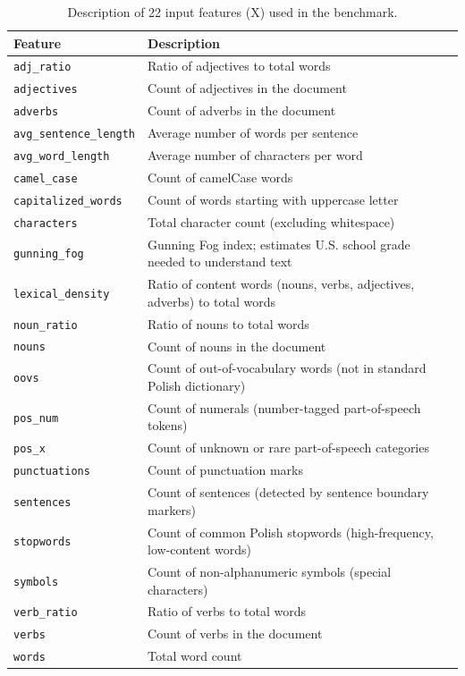 \documentclass[11pt]{article}
\begin{document}
\begin{table}[htbp]
\centering
\caption{Description of 22 input features (X) used in the benchmark.}
\label{tab:feature_descriptions}
\small
\begin{tabular}{lp{}}
\toprule
\textbf{Feature} & \textbf{Description} \\
\midrule
\texttt{adj\_ratio} & Ratio of adjectives to total words \\
\texttt{adjectives} & Count of adjectives in the document \\
\texttt{adverbs} & Count of adverbs in the document \\
\texttt{avg\_sentence\_length} & Average number of words per sentence \\
\texttt{avg\_word\_length} & Average number of characters per word \\
\texttt{camel\_case} & Count of camelCase words \\
\texttt{capitalized\_words} & Count of words starting with uppercase letter \\
\texttt{characters} & Total character count (excluding whitespace) \\
\texttt{gunning\_fog} & Gunning Fog index; estimates U.S. school grade needed to understand text \\
\texttt{lexical\_density} & Ratio of content words (nouns, verbs, adjectives, adverbs) to total words \\
\texttt{noun\_ratio} & Ratio of nouns to total words \\
\texttt{nouns} & Count of nouns in the document \\
\texttt{oovs} & Count of out-of-vocabulary words (not in standard Polish dictionary) \\
\texttt{pos\_num} & Count of numerals (number-tagged part-of-speech tokens) \\
\texttt{pos\_x} & Count of unknown or rare part-of-speech categories \\
\texttt{punctuations} & Count of punctuation marks \\
\texttt{sentences} & Count of sentences (detected by sentence boundary markers) \\
\texttt{stopwords} & Count of common Polish stopwords (high-frequency, low-content words) \\
\texttt{symbols} & Count of non-alphanumeric symbols (special characters) \\
\texttt{verb\_ratio} & Ratio of verbs to total words \\
\texttt{verbs} & Count of verbs in the document \\
\texttt{words} & Total word count \\
\bottomrule
\end{tabular}
\end{table}
\end{document}
